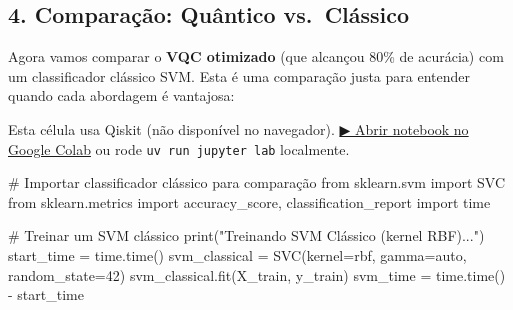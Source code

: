 \documentclass[
  brazilian,
]{report}
\newenvironment{Shaded}{\begin{snugshade}}{\end{snugshade}}
\newcommand{\BuiltInTok}[1]{\textcolor[rgb]{0.00,0.23,0.31}{#1}}
\newcommand{\CommentTok}[1]{\textcolor[rgb]{0.37,0.37,0.37}{#1}}
\newcommand{\DecValTok}[1]{\textcolor[rgb]{0.68,0.00,0.00}{#1}}
\newcommand{\ImportTok}[1]{\textcolor[rgb]{0.00,0.46,0.62}{#1}}
\newcommand{\NormalTok}[1]{\textcolor[rgb]{0.00,0.23,0.31}{#1}}
\newcommand{\OperatorTok}[1]{\textcolor[rgb]{0.37,0.37,0.37}{#1}}
\newcommand{\StringTok}[1]{\textcolor[rgb]{0.13,0.47,0.30}{#1}}
\begin{document}
\subsection{4. Comparação: Quântico
vs.~Clássico}\label{comparauxe7uxe3o-quuxe2ntico-vs.-cluxe1ssico}

Agora vamos comparar o \textbf{VQC otimizado} (que alcançou 80\% de
acurácia) com um classificador clássico SVM. Esta é uma comparação justa
para entender quando cada abordagem é vantajosa:

\begin{tcolorbox}[enhanced jigsaw, arc=.35mm, bottomrule=.15mm, bottomtitle=1mm, breakable, colback=white, colbacktitle=quarto-callout-warning-color!10!white, colframe=quarto-callout-warning-color-frame, coltitle=black, left=2mm, leftrule=.75mm, opacityback=0, opacitybacktitle=0.6, rightrule=.15mm, title=\textcolor{quarto-callout-warning-color}{\faExclamationTriangle}\hspace{0.5em}{⚛️ Célula Qiskit --- execute no Colab ou localmente}, titlerule=0mm, toprule=.15mm, toptitle=1mm]

Esta célula usa Qiskit (não disponível no navegador).
\href{https://colab.research.google.com/github/maxwellamaral/aula-quantum/blob/main/notebooks/20-quantum-machine-learning.ipynb}{▶
Abrir notebook no Google Colab} ou rode \texttt{uv\ run\ jupyter\ lab}
localmente.

\begin{Shaded}
\begin{Highlighting}[]

\CommentTok{\# Importar classificador clássico para comparação}
\ImportTok{from}\NormalTok{ sklearn.svm }\ImportTok{import}\NormalTok{ SVC}
\ImportTok{from}\NormalTok{ sklearn.metrics }\ImportTok{import}\NormalTok{ accuracy\_score, classification\_report}
\ImportTok{import}\NormalTok{ time}

\CommentTok{\# Treinar um SVM clássico}
\BuiltInTok{print}\NormalTok{(}\StringTok{"Treinando SVM Clássico (kernel RBF)..."}\NormalTok{)}
\NormalTok{start\_time }\OperatorTok{=}\NormalTok{ time.time()}
\NormalTok{svm\_classical }\OperatorTok{=}\NormalTok{ SVC(kernel}\OperatorTok{=}\StringTok{\textquotesingle{}rbf\textquotesingle{}}\NormalTok{, gamma}\OperatorTok{=}\StringTok{\textquotesingle{}auto\textquotesingle{}}\NormalTok{, random\_state}\OperatorTok{=}\DecValTok{42}\NormalTok{)}
\NormalTok{svm\_classical.fit(X\_train, y\_train)}
\NormalTok{svm\_time }\OperatorTok{=}\NormalTok{ time.time() }\OperatorTok{{-}}\NormalTok{ start\_time}


\end{Highlighting}
\end{Shaded}
\end{tcolorbox}
\end{document}
